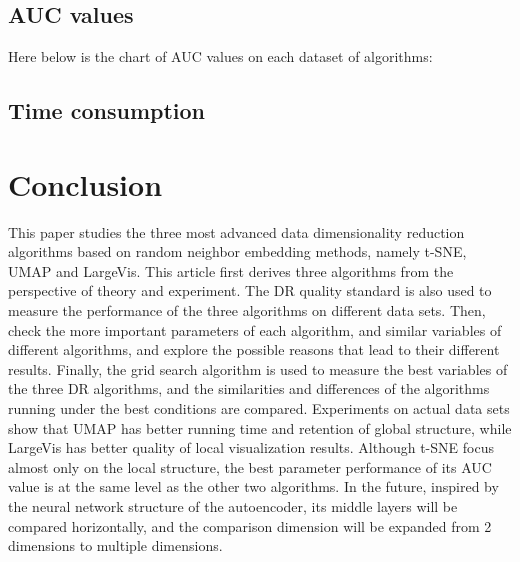 \section{AUC values}

Here below is the chart of AUC values on each dataset of algorithms:



\section{Time consumption}


\chapter{Conclusion}

This paper studies the three most advanced data dimensionality reduction algorithms based on random neighbor embedding methods, namely t-SNE, UMAP and LargeVis. This article first derives three algorithms from the perspective of theory and experiment. The DR quality standard is also used to measure the performance of the three algorithms on different data sets. Then, check the more important parameters of each algorithm, and similar variables of different algorithms, and explore the possible reasons that lead to their different results. Finally, the grid search algorithm is used to measure the best variables of the three DR algorithms, and the similarities and differences of the algorithms running under the best conditions are compared. Experiments on actual data sets show that UMAP has better running time and retention of global structure, while LargeVis has better quality of local visualization results. Although t-SNE focus almost only on the local structure, the best parameter performance of its AUC value is at the same level as the other two algorithms. In the future, inspired by the neural network structure of the autoencoder, its middle layers will be compared horizontally, and the comparison dimension will be expanded from 2 dimensions to multiple dimensions.




